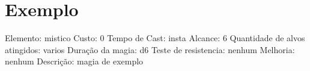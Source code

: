 \documentclass{article}%
\begin{document}
%
\normalsize%
\section{Exemplo}%
\label{sec:Exemplo}%
Elemento: mistico\newline%
Custo: 0\newline%
Tempo de Cast: insta\newline%
Alcance: 6\newline%
Quantidade de alvos atingidos: varios\newline%
Duração da magia: d6\newline%
Teste de resistencia: nenhum\newline%
Melhoria: nenhum\newline%
Descrição: magia de exemplo\newline%

%
\vspace{1cm}%
\end{document}
